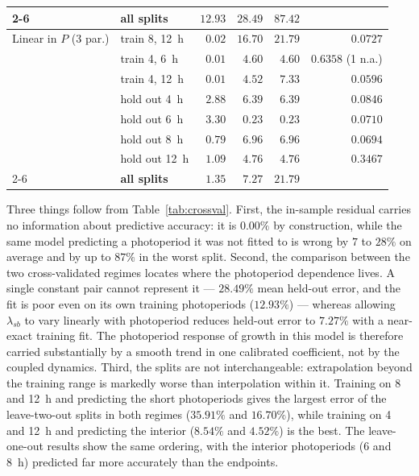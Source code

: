 \documentclass[a4paper,fleqn]{cas-sc}
\begin{document}
\begin{table}[!htbp]
\begin{tabular}{@{}llrrrr@{}}
\cmidrule(l){2-6}
                  & \textbf{all splits} & $\mathbf{12.93}$ & $\mathbf{28.49}$ & $\mathbf{87.42}$ & \\
\midrule
Linear in $P$ (3 par.) & train 8, 12~h & $0.02$ & $16.70$ & $21.79$ & $0.0727$ \\
                  & train 4, 6~h   & $0.01$ & $4.60$ & $4.60$ & $0.6358$ (1 n.a.) \\
                  & train 4, 12~h  & $0.01$ & $4.52$ & $7.33$ & $0.0596$ \\
                  & hold out 4~h   & $2.88$ & $6.39$ & $6.39$ & $0.0846$ \\
                  & hold out 6~h   & $3.30$ & $0.23$ & $0.23$ & $0.0710$ \\
                  & hold out 8~h   & $0.79$ & $6.96$ & $6.96$ & $0.0694$ \\
                  & hold out 12~h  & $1.09$ & $4.76$ & $4.76$ & $0.3467$ \\
\cmidrule(l){2-6}
                  & \textbf{all splits} & $\mathbf{1.35}$ & $\mathbf{7.27}$ & $\mathbf{21.79}$ & \\
\bottomrule
\end{tabular}
\end{table}

Three things follow from Table~\ref{tab:crossval}. First, the in-sample
residual carries no information about predictive accuracy: it is $0.00\%$ by
construction, while the same model predicting a photoperiod it was not fitted
to is wrong by $7$ to $28\%$ on average and by up to $87\%$ in the worst
split. Second, the comparison between the two cross-validated regimes locates
where the photoperiod dependence lives. A single constant pair cannot
represent it --- $28.49\%$ mean held-out error, and the fit is poor even on its
own training photoperiods ($12.93\%$) --- whereas allowing $\lambda_{sb}$ to
vary linearly with photoperiod reduces held-out error to $7.27\%$ with a
near-exact training fit. The photoperiod response of growth in this model is
therefore carried substantially by a smooth trend in one calibrated
coefficient, not by the coupled dynamics. Third, the splits are not
interchangeable: extrapolation beyond the training range is markedly worse
than interpolation within it. Training on 8 and 12~h and predicting the short
photoperiods gives the largest error of the leave-two-out splits in both
regimes ($35.91\%$ and $16.70\%$), while training on 4 and 12~h and predicting
the interior ($8.54\%$ and $4.52\%$) is the best. The leave-one-out results
show the same ordering, with the interior photoperiods (6 and 8~h) predicted
far more accurately than the endpoints.
\end{document}
